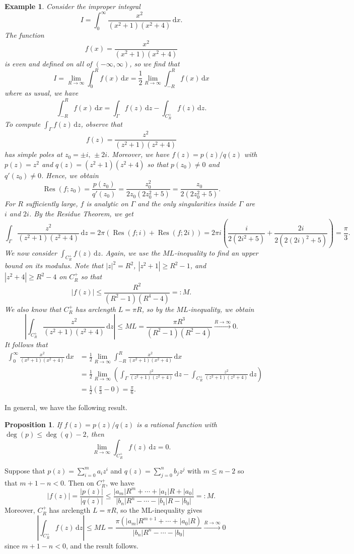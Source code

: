 \documentclass[10pt]{article}
\makeatletter
\newcommand{\dd}{\,\mathrm{d}}
\DeclareMathOperator{\Res}{Res}
\theoremstyle{newstyle}
\newtheorem{prop}[thm]{Proposition}
\newtheorem{exmp}[thm]{Example}
\newenvironment{pf}[1][\proofname]{\par
  \pushQED{\qed}%
  \normalfont \topsep0\p@\relax
  \trivlist
  \item[\hskip\labelsep\scshape
  #1\@addpunct{.}]\ignorespaces
}{%
  \popQED\endtrivlist\@endpefalse
}
\makeatother
\begin{document}
\begin{exmp}
Consider the improper integral 
\[ I = \int_0^\infty \frac{x^2}{(x^2+1)(x^2+4)}\dd x. \]
The function 
\[ f(x) = \frac{x^2}{(x^2+1)(x^2+4)} \] 
is even and defined on all of $(-\infty, \infty)$, so we find that 
\[ I = \lim_{R\to\infty} \int_0^R f(x)\dd x = \frac12 \lim_{R\to\infty} \int_{-R}^R f(x)\dd x \]
where as usual, we have 
\[ \int_{-R}^R f(x)\dd x = \int_\Gamma f(z)\dd z - \int_{C_R^+} f(z)\dd z. \]
To compute $\int_\Gamma f(z)\dd z$, observe that 
\[ f(z) = \frac{z^2}{(z^2+1)(z^2+4)} \]
has simple poles at $z_0 = \pm i,\, \pm2i$. Moreover, we have $f(z) = p(z)/q(z)$ with 
$p(z) = z^2$ and $q(z) = (z^2+1)(z^2+4)$ so that $p(z_0) \neq 0$ and $q'(z_0) \neq 0$. 
Hence, we obtain 
\[ \Res(f; z_0) = \frac{p(z_0)}{q'(z_0)} = \frac{z_0^2}{2z_0(2z_0^2+5)} = \frac{z_0}{2(2z_0^2 + 5)}. \]
For $R$ sufficiently large, $f$ is analytic on $\Gamma$ and the only singularities inside $\Gamma$
are $i$ and $2i$. By the Residue Theorem, we get 
\[ \int_\Gamma \frac{z^2}{(z^2+1)(z^2+4)}\dd z 
= 2\pi(\Res(f; i) + \Res(f; 2i)) = 2\pi i \left( \frac{i}{2(2i^2+5)} + \frac{2i}{2(2(2i)^2+5)} \right)
= \frac\pi3. \]
We now consider $\int_{C_R^+} f(z)\dd z$. Again, we use the $ML$-inequality to find an upper 
bound on its modulus. Note that $|z|^2 = R^2$, $|z^2 + 1| \geq R^2 - 1$, and $|z^2+4| \geq R^2-4$ 
on $C_R^+$ so that 
\[ |f(z)| \leq \frac{R^2}{(R^2-1)(R^4-4)} =: M. \]
We also know that $C_R^+$ has arclength $L = \pi R$, so by the $ML$-inequality, we obtain 
\[ \left| \int_{C_R^+} \frac{z^2}{(z^2+1)(z^2+4)} \dd z \right| \leq ML = 
\frac{\pi R^3}{(R^2-1)(R^2-4)} \xrightarrow[]{R\to\infty} 0. \]
It follows that 
\begin{align*}
    \int_0^\infty \frac{x^2}{(x^2+1)(x^2+4)}\dd x &= \frac12 \lim_{R\to\infty} \int_{-R}^R \frac{x^2}{(x^2+1)(x^2+4)}\dd x \\
    &= \frac12 \lim_{R\to\infty} \left( \int_\Gamma \frac{z^2}{(z^2+1)(z^2+4)}\dd z 
    - \int_{C_R^+} \frac{z^2}{(z^2+1)(z^2+4)}\dd z \right) \\
    &= \frac12 \left( \frac\pi3 - 0 \right) = \frac\pi6. 
\end{align*}
\end{exmp}


In general, we have the following result. 

\begin{prop}
If $f(z) = p(z)/q(z)$ is a rational function with $\deg(p) \leq \deg(q) - 2$, then 
\[ \lim_{R\to\infty} \int_{C_R^+} f(z)\dd z = 0. \]
\end{prop}
\begin{pf}
Suppose that $p(z) = \sum_{i=0}^m a_i z^i$ and $q(z) = \sum_{j=0}^n b_j z^j$ with $m \leq n-2$ 
so that $m+1-n < 0$. Then on $C_R^+$, we have 
\[ |f(z)| = \frac{|p(z)|}{|q(z)|} \leq \frac{|a_m|R^m + \cdots + |a_1|R + |a_0|}{|b_n|R^n - \cdots - |b_1|R - |b_0|} =: M. \] 
Moreover, $C_R^+$ has arclength $L = \pi R$, so the ML-inequality gives 
\[ \left| \int_{C_R^+} f(z)\dd z \right| \leq ML = \frac{\pi(|a_m|R^{m+1} + \cdots + |a_0|R)}{|b_n|R^n - \cdots - |b_0|} \xrightarrow[]{R\to\infty} 0 \]
since $m+1-n < 0$, and the result follows. 
\end{pf}
\end{document}

